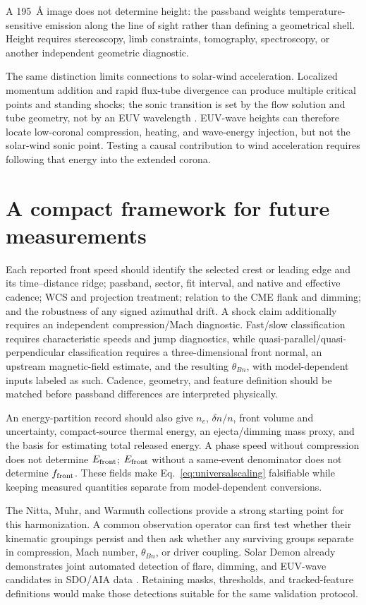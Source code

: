 \documentclass[11pt]{article}
\let\parencite\citep
\newcommand{\Efront}{E_{\rm front}}
\begin{document}
A 195~\AA{} image does not determine height: the passband weights temperature-sensitive emission along the line of sight rather than defining a geometrical shell. Height requires stereoscopy, limb constraints, tomography, spectroscopy, or another independent geometric diagnostic.

The same distinction limits connections to solar-wind acceleration. Localized momentum addition and rapid flux-tube divergence can produce multiple critical points and standing shocks; the sonic transition is set by the flow solution and tube geometry, not by an EUV wavelength \parencite{Habbal1985,Habbal1994}. EUV-wave heights can therefore locate low-coronal compression, heating, and wave-energy injection, but not the solar-wind sonic point. Testing a causal contribution to wind acceleration requires following that energy into the extended corona.

\section{A compact framework for future measurements}
Each reported front speed should identify the selected crest or leading edge and its time--distance ridge; passband, sector, fit interval, and native and effective cadence; WCS and projection treatment; relation to the CME flank and dimming; and the robustness of any signed azimuthal drift. A shock claim additionally requires an independent compression/Mach diagnostic. Fast/slow classification requires characteristic speeds and jump diagnostics, while quasi-parallel/quasi-perpendicular classification requires a three-dimensional front normal, an upstream magnetic-field estimate, and the resulting $\theta_{Bn}$, with model-dependent inputs labeled as such. Cadence, geometry, and feature definition should be matched before passband differences are interpreted physically.

An energy-partition record should also give $n_e$, $\delta n/n$, front volume and uncertainty, compact-source thermal energy, an ejecta/dimming mass proxy, and the basis for estimating total released energy. A phase speed without compression does not determine $\Efront$; $\Efront$ without a same-event denominator does not determine $f_{\rm front}$. These fields make Eq.~\eqref{eq:universalscaling} falsifiable while keeping measured quantities separate from model-dependent conversions.

The Nitta, Muhr, and Warmuth collections provide a strong starting point for this harmonization. A common observation operator can first test whether their kinematic groupings persist and then ask whether any surviving groups separate in compression, Mach number, $\theta_{Bn}$, or driver coupling. Solar Demon already demonstrates joint automated detection of flare, dimming, and EUV-wave candidates in SDO/AIA data \parencite{KraaikampVerbeeck2015}. Retaining masks, thresholds, and tracked-feature definitions would make those detections suitable for the same validation protocol.
\end{document}
